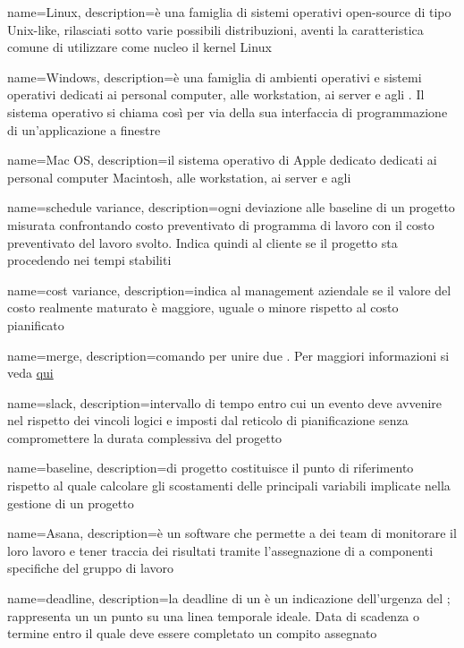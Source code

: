  {
	name=Linux,
	description={è una famiglia di sistemi operativi open-source di tipo Unix-like, rilasciati sotto varie possibili distribuzioni, aventi la caratteristica comune di utilizzare come nucleo il kernel Linux}
}

 {
	name=Windows,
	description={è una famiglia di ambienti operativi e sistemi operativi dedicati ai personal computer, alle workstation, ai server e agli . Il sistema operativo si chiama così per via della sua interfaccia di programmazione di un'applicazione a finestre}
}

 {
	name=Mac OS,
	description={il sistema operativo di Apple dedicato dedicati ai personal computer Macintosh, alle workstation, ai server e agli   }
}


 {
	name=schedule variance,
	description={ogni deviazione alle baseline di un progetto misurata confrontando costo preventivato di programma di lavoro con il costo preventivato del lavoro svolto. Indica quindi al cliente se il progetto sta procedendo nei tempi stabiliti}
}

 {
	name=cost variance,
	description={indica al management aziendale se il valore del costo realmente maturato è maggiore, uguale o minore rispetto al costo pianificato}
}


 {
	name=merge,
	description={comando  per unire due . Per maggiori informazioni si veda \href{https://git-scm.com/docs/}{qui}}
}

 {
	name=slack,
	description={intervallo di tempo entro cui un evento deve avvenire nel rispetto dei vincoli logici e imposti dal reticolo di pianificazione senza compromettere la durata complessiva del progetto}
}

 {
	name=baseline,
	description={di progetto costituisce il punto di riferimento rispetto al quale calcolare gli scostamenti delle principali variabili implicate nella gestione di un progetto}
}

 {
	name=Asana,
	description={è un software che permette a dei team di monitorare il loro lavoro e tener traccia dei risultati tramite l'assegnazione di  a componenti specifiche del gruppo di lavoro}
}

 {
	name=deadline,
	description={la deadline di un  è un indicazione dell'urgenza del ; rappresenta un un punto su una linea temporale ideale. Data di scadenza o termine entro il quale deve essere completato un compito assegnato}
}

